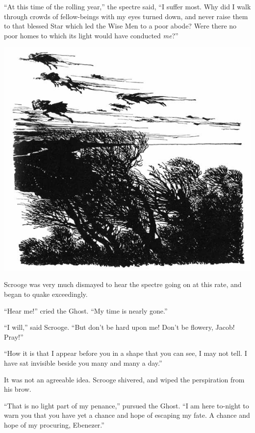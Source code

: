 \documentclass[paper=a5,BCOR=15mm,twoside,DIV=15,headinclude=off,12pt,chapterprefix=off,openany,headings=huge]{scrbook} %
\begin{document}
\enquote{At this time of the rolling year,} the spectre said, \enquote{I suffer most. Why did I walk through crowds of fellow-beings with my eyes turned down, and never raise them to that blessed Star which led the Wise Men to a poor abode? Were there no poor homes to which its light would have conducted \textit{me}?}
 \begin{center}
     \vfill%
     \includegraphics[width=\columnwidth]{gs045b}
 \end{center}
\clearpage




Scrooge was very much dismayed to hear the spectre going on at this rate, and began to quake exceedingly.

\enquote{Hear me!} cried the Ghost. \enquote{My time is nearly gone.}

\enquote{I will,} said Scrooge. \enquote{But don't be hard upon me! Don't be flowery, Jacob! Pray!}

\enquote{How it is that I appear before you in a shape that you can see, I may not tell. I have sat invisible beside you many and many a day.}

It was not an agreeable idea. Scrooge shivered, and wiped the perspiration from his brow.

\enquote{That is no light part of my penance,} pursued the Ghost. \enquote{I am here to-night to warn you that you have yet a chance and hope of escaping my fate. A chance and hope of my procuring, Ebenezer.}
\end{document}

